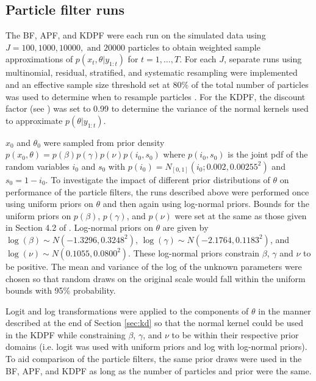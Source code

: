 \documentclass[useAMS,referee,usenatbib]{biom}
\begin{document}
\subsection{Particle filter runs \label{sec:pf}}

The BF, APF, and KDPF were each run on the simulated data using $J = 100, 1000, 10000, \mbox{ and } 20000$ particles to obtain weighted sample approximations of $p(x_t,\theta|y_{1:t})$ for $t = 1,\ldots,T$.  For each $J$, separate runs using multinomial, residual, stratified, and systematic resampling were implemented and an effective sample size threshold set at 80\% of the total number of particles was used to determine when to resample particles \citep{Liu:Chen:Wong:reje:1998}. For the KDPF, the discount factor (see \citet{Liu:West:comb:2001}) was set to 0.99 to determine the variance of the normal kernels used to approximate $p(\theta|y_{1:t})$.

$x_0$ and $\theta_0$ were sampled from prior density $p(x_0,\theta) = p(\beta)p(\gamma)p(\nu)p(i_0,s_0)$ where $p(i_0,s_0)$ is the joint pdf of the random variables $i_0$ and $s_0$ with $p(i_0) = N_{[0,1]}(i_0;0.002,0.00255^2)$ and $s_0 = 1 - i_0$. %
To investigate the impact of different prior distributions of $\theta$ on performance of the particle filters, the runs described above were performed once using uniform priors on $\theta$ and then again using log-normal priors.  Bounds for the uniform priors on $p(\beta)$, $p(\gamma)$, and $p(\nu)$ were set at the same as those given in Section 4.2 of \citet{skvortsov2012monitoring}. %
Log-normal priors on $\theta$ are given by $\log(\beta) \sim  N(-1.3296, 0.3248^2)$, $\log(\gamma) \sim N(-2.1764, 0.1183^2)$, and $\log(\nu) \sim N(0.1055, 0.0800^2)$. These log-normal priors constrain $\beta$, $\gamma$ and $\nu$ to be positive.  The mean and variance of the log of the unknown parameters were chosen so that random draws on the original scale would fall within the uniform bounds with 95\% probability.

Logit and log transformations were applied to the components of $\theta$ in the manner described at the end of Section \ref{sec:kd} so that the normal kernel could be used in the KDPF while constraining $\beta$, $\gamma$, and $\nu$ to be within their respective prior domains (i.e. logit was used with uniform priors and log with log-normal priors).  To aid comparison of the particle filters, the same prior draws were used in the BF, APF, and KDPF as long as the number of particles and prior were the same.
\end{document}
